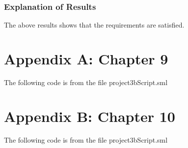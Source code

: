 \documentclass{report}
\begin{document}
\subsection{Explanation of Results}
\label{sec:explanation-results-5}
The above results shows that the requirements are satisfied.



\chapter{Appendix A: Chapter 9}
\label{cha:appendix-a:chapter9}

The following code is from the file project3bScript.sml


\chapter{Appendix B: Chapter 10}
\label{cha:appendix-a:chapter10}

The following code is from the file project3bScript.sml

\end{document}
